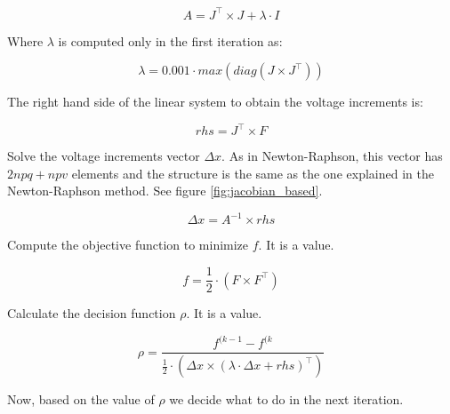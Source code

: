 \documentclass[a4paper,twoside,fleqn]{tufte-book}
\begin{document}
\begin{equation}
A = J^\top \times J + \lambda \cdot I
\label{eq:lm_A}
\end{equation}

Where $\lambda$ is computed only in the first iteration as:

\begin{equation}
\lambda = 0.001 \cdot max(diag(J \times J^\top))
\end{equation}

The right hand side of the linear system to obtain the voltage increments is:


\begin{equation}
rhs = J^\top \times F
\label{eq:lm_rhs}
\end{equation}


Solve the voltage increments vector $\Delta x$. As in Newton-Raphson, this vector has $2npq+npv$ elements and the structure is the same as the one explained in the Newton-Raphson method. See figure \ref{fig:jacobian_based}.


\begin{equation}
\Delta x = A^{-1} \times rhs
\label{eq:lm_solve}
\end{equation}



Compute the objective function to minimize $f$. It is a value.

\begin{equation}
f = \frac{1}{2} \cdot (F \times F^\top)
\label{eq:lm_f}
\end{equation}

Calculate the decision function $\rho$. It is a value.


\begin{equation}
\rho = \frac{f^{(k-1}-f^{(k}}{\frac{1}{2} \cdot (\Delta x \times (\lambda \cdot \Delta x + rhs)^\top)}
\label{eq:lm_rho}
\end{equation}

Now, based on the value of $\rho$ we decide what to do in the next iteration.
\end{document}
